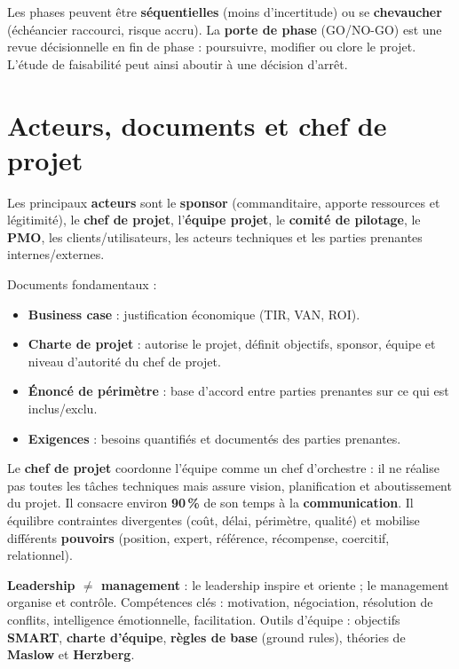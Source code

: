 \documentclass[11pt,a4paper]{article}
\begin{document}
Les phases peuvent être \textbf{séquentielles} (moins d'incertitude) ou se \textbf{chevaucher} (échéancier raccourci, risque accru). La \textbf{porte de phase} (GO/NO-GO) est une revue décisionnelle en fin de phase : poursuivre, modifier ou clore le projet. L'étude de faisabilité peut ainsi aboutir à une décision d'arrêt.

\section{Acteurs, documents et chef de projet}

Les principaux \textbf{acteurs} sont le \textbf{sponsor} (commanditaire, apporte ressources et légitimité), le \textbf{chef de projet}, l'\textbf{équipe projet}, le \textbf{comité de pilotage}, le \textbf{PMO}, les clients/utilisateurs, les acteurs techniques et les parties prenantes internes/externes.

Documents fondamentaux :
\begin{itemize}
    \item \textbf{Business case} : justification économique (TIR, VAN, ROI).
    \item \textbf{Charte de projet} : autorise le projet, définit objectifs, sponsor, équipe et niveau d'autorité du chef de projet.
    \item \textbf{Énoncé de périmètre} : base d'accord entre parties prenantes sur ce qui est inclus/exclu.
    \item \textbf{Exigences} : besoins quantifiés et documentés des parties prenantes.
\end{itemize}

Le \textbf{chef de projet} coordonne l'équipe comme un chef d'orchestre : il ne réalise pas toutes les tâches techniques mais assure vision, planification et aboutissement du projet. Il consacre environ \textbf{90\,\%} de son temps à la \textbf{communication}. Il équilibre contraintes divergentes (coût, délai, périmètre, qualité) et mobilise différents \textbf{pouvoirs} (position, expert, référence, récompense, coercitif, relationnel).

\textbf{Leadership $\neq$ management} : le leadership inspire et oriente ; le management organise et contrôle. Compétences clés : motivation, négociation, résolution de conflits, intelligence émotionnelle, facilitation. Outils d'équipe : objectifs \textbf{SMART}, \textbf{charte d'équipe}, \textbf{règles de base} (ground rules), théories de \textbf{Maslow} et \textbf{Herzberg}.
\end{document}
